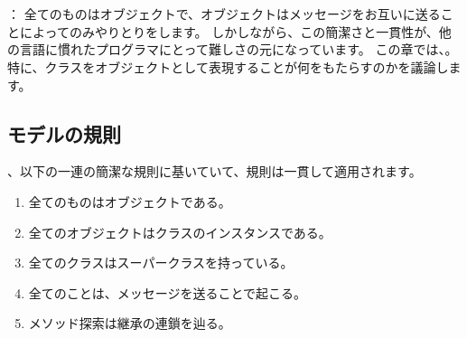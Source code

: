 \documentclass[a4paper,10pt,twoside]{book}
\begin{document}
	\renewcommand{\nnbb}[2]{} %
	\sloppy
\fi
\chapter{}

： 全てのものはオブジェクトで、オブジェクトはメッセージをお互いに送ることによってのみやりとりをします。
しかしながら、この簡潔さと一貫性が、他の言語に慣れたプログラマにとって難しさの元になっています。
この章では、。特に、クラスをオブジェクトとして表現することが何をもたらすのかを議論します。

\section{モデルの規則}

、以下の一連の簡潔な規則に基いていて、規則は一貫して適用されます。

\begin{enumerate}[label={\textbf{Rule \arabic{*}}.}, ref={Rule \arabic{*}}, leftmargin=*]
\item{} 
	全てのものはオブジェクトである。

\item{} 
	全てのオブジェクトはクラスのインスタンスである。

\item{}  
	全てのクラスはスーパークラスを持っている。

\item{}  
	全てのことは、メッセージを送ることで起こる。

\item{}  
	メソッド探索は継承の連鎖を辿る。

\end{enumerate}
\end{document}
